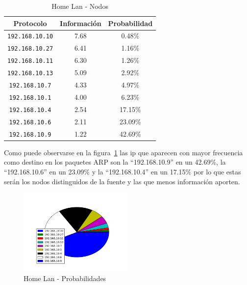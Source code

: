 \documentclass[final,inline,narroweqnarray,a4paper]{ieee}
\begin{document}
\begin{table}[H]
    \begin{center}
        \begin{tabular}{|c|c|c|}
            \hline
            \textbf{Protocolo} & \textbf{Información} & \textbf{Probabilidad} \\ \hline
            \texttt{192.168.10.10}&7.68        & 0.48\%     \\ \hline
            \texttt{192.168.10.27}&6.41        & 1.16\%     \\ \hline
            \texttt{192.168.10.11}&6.30        & 1.26\%     \\ \hline
            \texttt{192.168.10.13}&5.09        & 2.92\%     \\ \hline
            \texttt{192.168.10.7}&4.33         & 4.97\%     \\ \hline
            \texttt{192.168.10.1}&4.00         & 6.23\%     \\ \hline
            \texttt{192.168.10.4}&2.54         & 17.15\%    \\ \hline
            \texttt{192.168.10.6}&2.11         & 23.09\%    \\ \hline
            \texttt{192.168.10.9}&1.22         & 42.69\%    \\ \hline
        \end{tabular}
        \caption{Home Lan - Nodos}
        \label{table:homelanS1}
    \end{center}
\end{table}

Como puede observarse en la figura~\ref{torta:homelanS1} las ip que aparecen con mayor frecuencia como destino en los paquetes ARP son la ``192.168.10.9'' en un 42.69\%, la ``192.168.10.6'' en un 23.09\% y la ``192.168.10.4'' en un 17.15\% por lo que estas serán los nodos distinguidos de la fuente y las que menos información aporten.

\begin{figure}[H]
    \begin{center}
        \includegraphics[width=0.5\textwidth]{plot/homelanS1-pie.png}
        \caption{Home Lan - Probabilidades}
        \label{torta:homelanS1}
    \end{center}
\end{figure} 
\end{document}
